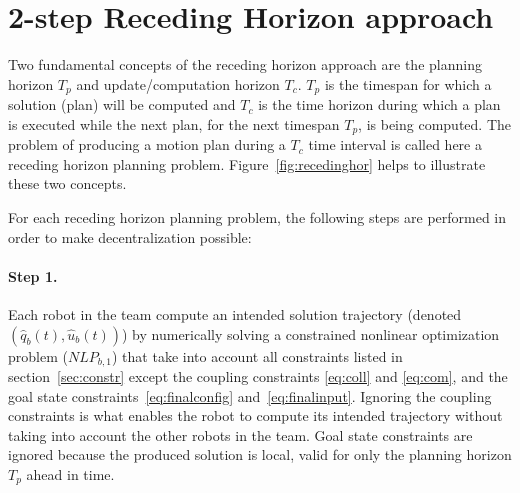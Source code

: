 



%
%
%

\section{2-step Receding Horizon approach}\label{subsec:rha}




Two fundamental concepts of the receding horizon approach are the planning horizon $T_p$ and update/computation horizon $T_c$. $T_p$ is the timespan for which a solution (plan) will be computed and $T_c$ is the time horizon during which a plan is executed while the
next plan, for the next timespan $T_p$, is being computed.
The problem of producing a motion plan during a $T_c$ time interval is called
here a receding horizon planning problem. Figure~\ref{fig:recedinghor} helps to illustrate these two concepts.

For each receding horizon planning problem, the following steps are performed in order to make decentralization possible:
\paragraph{Step 1.}\label{step1} Each robot in the team compute an intended solution trajectory (denoted $(\hat{q}_b(t), \hat{u}_b(t))$)
by numerically solving a constrained nonlinear optimization problem ($NLP_{b,1}$) that take into account all constraints listed in section~\ref{sec:constr} except the coupling
constraints \ref{eq:coll} and \ref{eq:com}, and the goal state constraints~\ref{eq:finalconfig} and~\ref{eq:finalinput}. Ignoring the coupling constraints is what enables the robot to compute its intended trajectory without taking into account the other robots in the team. Goal state constraints are ignored because the produced solution is local, valid for only the planning horizon $T_p$ ahead in time.
